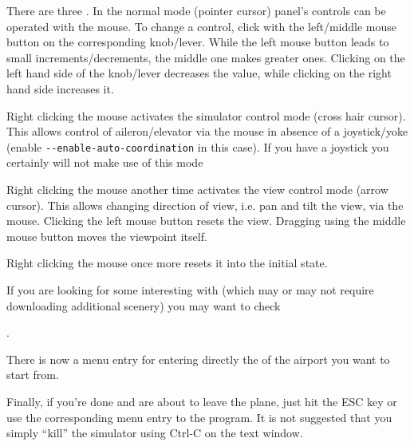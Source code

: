 There are three . In the normal mode
(pointer cursor) panel's controls can be operated with the mouse. To
change a control, click with the left/middle mouse button on the
corresponding knob/lever. While the left mouse button leads to small
increments/decrements, the middle one makes greater ones. Clicking on
the left hand side of the knob/lever decreases the value, while
clicking on the right hand side increases it.

 Right clicking the mouse activates the simulator control mode (cross
 hair cursor). This allows control of aileron/elevator via the mouse in
 absence of a joystick/yoke (enable \texttt{-$
 $-enable-auto-coordination} in this case). If you have a joystick you
 certainly will not make use of this mode

 Right clicking the mouse another time activates the view control mode (arrow
cursor).
 This allows changing direction of view, i.e. pan and tilt the view, via the
mouse. 
 Clicking the left mouse button resets the view. 
 Dragging using the middle mouse button moves the viewpoint itself.

 Right clicking the mouse once more resets it into the initial state.

If you are looking for some interesting  with
\FlightGear{}
(which may or may not require downloading additional scenery) you may want to
check
 \medskip

 .
  \medskip

\noindent
 There is now a menu entry for entering directly the  of the
airport you want to start from.

Finally, if you're done and are about to leave the plane, just hit the ESC key
or use the
corresponding menu entry to  the program. It is not suggested that
you simply
``kill'' the simulator using Ctrl-C on the text window.



